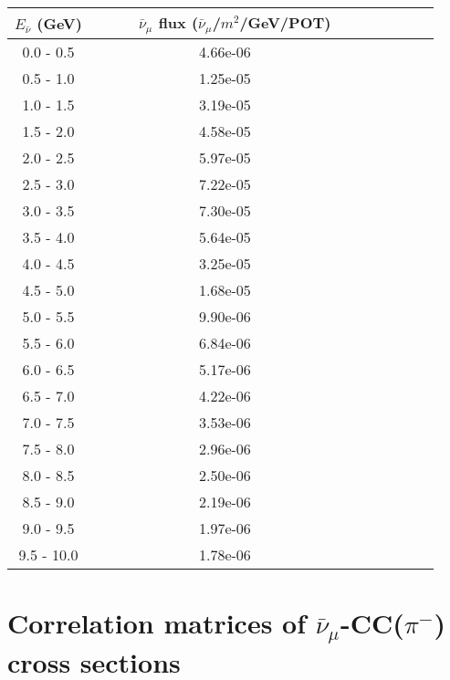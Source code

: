 \documentclass[aps, prd, reprint,showpacs,  preprintnumbers,amsmath,amssymb,superscriptaddress, nofootinbib]{revtex4-1}
\makeatletter
\newcommand{\anu}{\ensuremath{\bar{\nu}}}
\newcommand{\anumu}{\ensuremath{\bar{\nu}_{\mu}}}
\renewenvironment{table}
  {\def\@captype{table}}
  {}
\makeatother
\begin{document}
\begin{table}
\centering
\begin{tabular}{ccccccc}
\hline
$E_{\anu}$ (GeV) & ~~~~~$\bar{\nu}_\mu$ flux ($\bar{\nu}_\mu$/$m^2$/GeV/POT)  ~~\\
\hline
  0.0 -   0.5 &  4.66e-06 \\ 
  0.5 -   1.0 &  1.25e-05 \\ 
  1.0 -   1.5 &  3.19e-05 \\ 
  1.5 -   2.0 &  4.58e-05 \\ 
  2.0 -   2.5 &  5.97e-05 \\ 
  2.5 -   3.0 &  7.22e-05 \\ 
  3.0 -   3.5 &  7.30e-05 \\ 
  3.5 -   4.0 &  5.64e-05 \\ 
  4.0 -   4.5 &  3.25e-05 \\ 
  4.5 -   5.0 &  1.68e-05 \\ 
  5.0 -   5.5 &  9.90e-06 \\ 
  5.5 -   6.0 &  6.84e-06 \\ 
  6.0 -   6.5 &  5.17e-06 \\ 
  6.5 -   7.0 &  4.22e-06 \\ 
  7.0 -   7.5 &  3.53e-06 \\ 
  7.5 -   8.0 &  2.96e-06 \\ 
  8.0 -   8.5 &  2.50e-06 \\ 
  8.5 -   9.0 &  2.19e-06 \\ 
  9.0 -   9.5 &  1.97e-06 \\ 
  9.5 -  10.0 &  1.78e-06 \\   
\hline
\end{tabular}
\caption{The antineutrino flux used for the cross-section calculations.
This flux is also used by the GENIE, NuWro, and GiBUU event generators to produce the model predictions
shown in the paper.}
\label{tb:flux-table}
\end{table}



\section{Correlation matrices of $\anumu$-CC($\pi^{-}$) cross sections}

\vspace{0.3cm}
\end{document}
